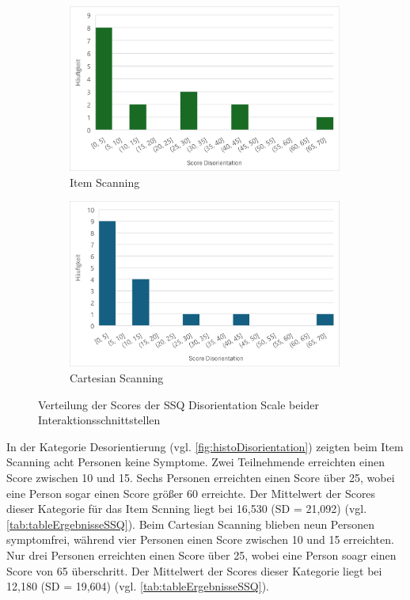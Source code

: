 \begin{figure}
    \centering
    \begin{subfigure}{.5\textwidth}
        \centering
        \includegraphics[width=0.99\textwidth]{images/Results/Histogramm-Disorientation-Scale-Item.png}
        \caption{Item Scanning}
        \label{fig:histoDisorientationItem}   
    \end{subfigure}%
    \begin{subfigure}{.5\textwidth}
        \centering
        \includegraphics[width=0.99\textwidth]{images/Results/Histogramm-Disorientation-Scale-Cartesian.png}
         \caption{Cartesian Scanning}
         \label{fig:histoDisorientationCartesian}
    \end{subfigure}
    \caption{Verteilung der Scores der SSQ Disorientation Scale beider Interaktionsschnittstellen}
    \label{fig:histoDisorientation}
\end{figure}

In der Kategorie Desorientierung (vgl. \autoref{fig:histoDisorientation}) zeigten beim Item Scanning acht Personen keine Symptome. Zwei Teilnehmende erreichten einen Score zwischen 10 und 15. Sechs Personen erreichten einen Score über 25, wobei eine Person sogar einen Score größer 60 erreichte. Der Mittelwert der Scores dieser Kategorie für das Item Scnning liegt bei 16,530 (SD = 21,092) (vgl. \autoref{tab:tableErgebnisseSSQ}). Beim Cartesian Scanning blieben neun Personen symptomfrei, während vier Personen einen Score zwischen 10 und 15 erreichten. Nur drei Personen erreichten einen Score über 25, wobei eine Person soagr einen Score von 65 überschritt. Der Mittelwert der Scores dieser Kategorie liegt bei 12,180 (SD = 19,604) (vgl. \autoref{tab:tableErgebnisseSSQ}).

